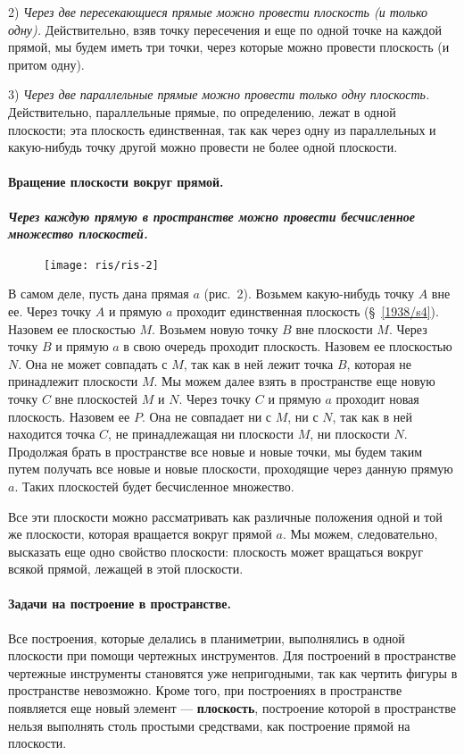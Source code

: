 \documentclass[twoside]{book}
\begin{document}
2) \emph{Через две пересекающиеся прямые можно провести плоскость (и только одну).} Действительно, взяв точку пересечения и еще по одной точке на каждой прямой, мы будем иметь три точки, через которые можно провести плоскость (и притом одну). %

3) \emph{Через две параллельные прямые можно провести только одну плоскость.} Действительно, параллельные прямые, по определению, лежат в одной плоскости;
эта плоскость единственная, так как через одну из параллельных и какую-нибудь точку другой можно провести не более одной плоскости.


\paragraph{Вращение плоскости вокруг прямой.}\label{1938/s5} 
\textbf{\emph{Через каждую прямую в пространстве можно провести бесчисленное множество плоскостей.}}

\begin{figure}[h!]
\centering
\texttt{[image: ris/ris-2]}
\caption{}
\end{figure} 

В самом деле, пусть дана прямая $a$ (рис.~2).
Возьмем какую-нибудь точку $A$ вне ее. 
Через точку $A$ и прямую $a$ проходит единственная плоскость (§~\ref{1938/s4}).
Назовем ее плоскостью $M$.
Возьмем новую точку $B$ вне плоскости $M$.
Через точку $B$ и прямую $a$ в свою очередь проходит плоскость.
Назовем ее плоскостью $N$. 
Она не может совпадать с $M$, так как в ней лежит точка $B$, которая не принадлежит плоскости $M$.
Мы можем далее взять в пространстве еще новую точку $C$ вне плоскостей $M$ и $N$.
Через точку $C$ и прямую $a$ проходит новая плоскость.
Назовем ее $P$.
Она не совпадает ни с $M$, ни с $N$, так как в ней находится точка $C$, не принадлежащая ни плоскости $M$, ни плоскости $N$.
Продолжая брать в пространстве все новые и новые точки, мы будем таким путем получать все новые и новые плоскости, проходящие через данную прямую $a$.
Таких плоскостей будет бесчисленное множество.

Все эти плоскости можно рассматривать как различные положения одной и той же плоскости, которая вращается вокруг прямой $a$.
Мы можем, следовательно, высказать еще одно свойство плоскости: {плоскость может вращаться вокруг всякой прямой, лежащей в этой плоскости.}

\paragraph{Задачи на построение в пространстве.}\label{1938/s6}
Все построения, которые делались в планиметрии, выполнялись в одной плоскости при помощи чертежных инструментов.
Для построений в пространстве чертежные инструменты становятся уже непригодными, так как чертить фигуры в пространстве невозможно.
Кроме того, при построениях в пространстве появляется еще новый элемент --- \textbf{плоскость}, построение которой в пространстве нельзя выполнять столь простыми средствами, как построение прямой на плоскости.
\end{document}
